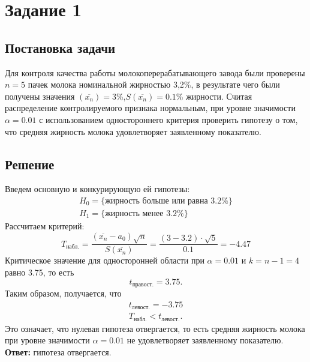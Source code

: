 \newpage
\section*{Задание 1}
\large

\subsection*{Постановка задачи}
Для контроля качества работы молокоперерабатывающего завода были проверены $n=5$ пачек молока номинальной жирностью 3,2\%, в результате чего были получены значения $(\overline{x_n })=3$\%,$S(\overline{x_n })=0.1$\% жирности. Считая распределение контролируемого признака нормальным, при уровне значимости $\alpha=0.01$ с использованием одностороннего критерия проверить гипотезу о том, что средняя жирность молока удовлетворяет заявленному показателю.
\subsection*{Решение}
Введем основную и конкурирующую ей гипотезы:
\begin{eqnarray}H_0 = \{\text{жирность больше или равна 3.2\%}\}\\ H_1 = \{\text{жирность менее 3.2\%}\}\end{eqnarray}
Рассчитаем критерий:
\begin{equation}T_{\text{набл.}}=\frac{(\overline{x_n}-a_0)\sqrt{n}}{S(\overline{x_n })}=\frac{(3-3.2) \cdot \sqrt{5}}{0.1}=-4.47\end{equation}
Критическое значение для односторонней области при $\alpha=0.01$ и $k=n-1=4$ равно 3.75, то есть
\begin{equation}
t_{\text{правост.}}=3.75.
\end{equation}
Таким образом, получается, что
\begin{eqnarray}
t_{\text{левост.}}=-3.75\\T_{\text{набл.}} < t_{\text{левост.}}.
\end{eqnarray}
Это означает, что нулевая гипотеза отвергается, то есть средняя жирность молока при уровне значимости $\alpha=0.01$ не удовлетворяет заявленному показателю.\\
\textbf{Ответ:} гипотеза отвергается.

